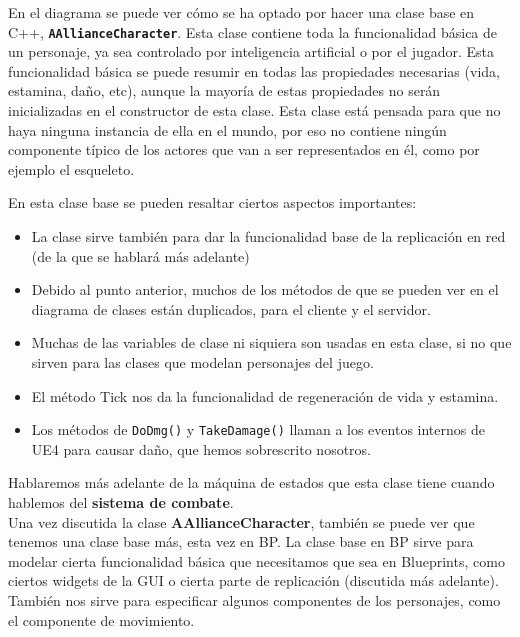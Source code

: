 En el diagrama se puede ver cómo se ha optado por hacer una clase base en C++, \texttt{\textbf{AAllianceCharacter}}. Esta clase contiene toda la funcionalidad básica de un personaje, ya sea controlado por inteligencia artificial o por el jugador. Esta funcionalidad básica se puede resumir en todas las propiedades necesarias (vida, estamina, daño, etc), aunque la mayoría de estas propiedades no serán inicializadas en el constructor de esta clase. Esta clase está pensada para que no haya ninguna instancia de ella en el mundo, por eso no contiene ningún componente típico de los actores que van a ser representados en él, como por ejemplo el esqueleto.
\\

\pagestyle{notsection}

En esta clase base se pueden resaltar ciertos aspectos importantes:
\begin{itemize}
\item La clase sirve también para dar la funcionalidad base de la replicación en red (de la que se hablará más adelante)
\item Debido al punto anterior, muchos de los métodos de que se pueden ver en el diagrama de clases están duplicados, para el cliente y el servidor.
\item Muchas de las variables de clase ni siquiera son usadas en esta clase, si no que sirven para las clases que modelan personajes del juego.
\item El método Tick nos da la funcionalidad de regeneración de vida y estamina.
\item Los métodos de \texttt{DoDmg()} y \texttt{TakeDamage()} llaman a los eventos internos de \ac{UE4} para causar daño, que hemos sobrescrito nosotros.
\end{itemize}


Hablaremos más adelante de la máquina de estados que esta clase tiene cuando hablemos del \textbf{sistema de combate}.
\\

Una vez discutida la clase \textbf{AAllianceCharacter}, también se puede ver que tenemos una clase base más, esta vez en \ac{BP}. La clase base en \ac{BP} sirve para modelar cierta funcionalidad básica que necesitamos que sea en Blueprints, como ciertos widgets de la \ac{GUI} o cierta parte de replicación (discutida más adelante). También nos sirve para especificar algunos componentes de los personajes, como el componente de movimiento.
\\

